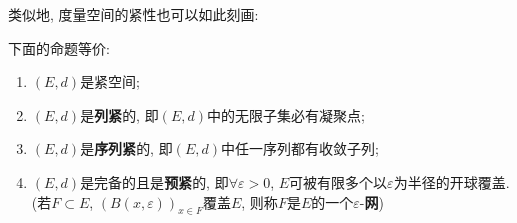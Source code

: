 类似地, 度量空间的紧性也可以如此刻画:

\begin{Theorem}[紧等价]\label{thm:紧等价}
	下面的命题等价:
	\begin{enumerate}[(1)]
		\item $ (E,d) $是紧空间;
		\item $ (E,d) $是\textbf{列紧}的, 即$ (E,d) $中的无限子集必有凝聚点;
		\item $ (E,d) $是\textbf{序列紧}的, 即$ (E,d) $中任一序列都有收敛子列;
		\item $ (E,d) $是完备的且是\textbf{预紧}的, 即$ \forall\varepsilon>0 $, $ E $可被有限多个以$ \varepsilon $为半径的开球覆盖. (若$ F\subset E $, $ (B(x,\varepsilon))_{x\in F} $覆盖$ E $, 则称$ F $是$ E $的一个$ \varepsilon $-\textbf{网})
	\end{enumerate}
\end{Theorem}


